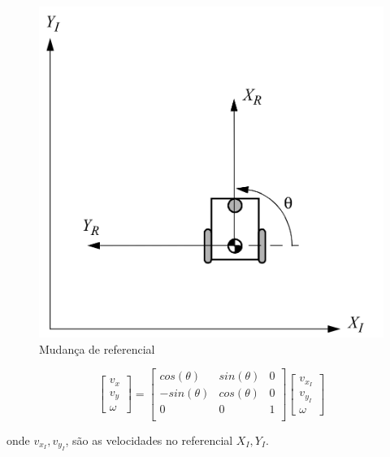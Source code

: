 \begin{figure}[H]
    \centering
    \includegraphics[scale=0.3]{figuras/robo_coordenadas.png}
    \caption[]{Mudança de referencial}
\end{figure}

\[
    \begin{bmatrix}
        v_x \\
        v_y \\
        \omega
    \end{bmatrix}
    =
    \begin{bmatrix}
        cos(\theta)  & sin(\theta) & 0 \\
        -sin(\theta) & cos(\theta) & 0 \\
        0 & 0 & 1 \\
    \end{bmatrix}
    \begin{bmatrix}
        v_{x_I} \\
        v_{y_I} \\
        \omega
    \end{bmatrix}
\]

onde $v_{x_I}, v_{y_I}$, são as velocidades no referencial $X_I,Y_I$.
\newpage

